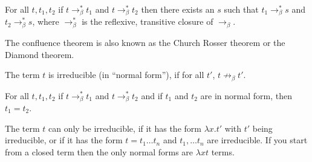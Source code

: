 \begin{theorem}[Confluence]
    For all $t, t_1, t_2$ if $t \to_{\beta}^* t_1$ and $t \to_{\beta}^* t_2$ then there exists an $s$ such that $t_1 \to_{\beta}^* s$ and $t_2 \to_{\beta}^* s$, where $ \to_{\beta}^*$ is the reflexive, transitive closure of $\to_{\beta}$.
\end{theorem}

\begin{remark}
    The confluence theorem is also known as the Church Rosser theorem or the Diamond theorem.
         \begin{center}
 \end{center}
\end{remark}

\begin{definition}
    The term $t$ is irreducible (in ``normal form''), if for all $t'$, $t\not\to_{\beta} t'$. 
\end{definition}

\begin{corollary}
    For all $t, t_1, t_2$ if $t \to_{\beta}^* t_1$ and $t \to_{\beta}^* t_2$ and
    if $t_1$ and $t_2$ are in normal form, then $t_1=t_2$.
\end{corollary}

\begin{remark}
    The term $t$ can only be irreducible, if it has the form $\lambda x.t'$ with $t'$ being irreducible, or if it has the form $t= t_1 \dots t_n$ and $t_1, \dots t_n$ are irreducible. If you start from a closed term then the only normal forms are $\lambda x t$ terms. 
\end{remark}

